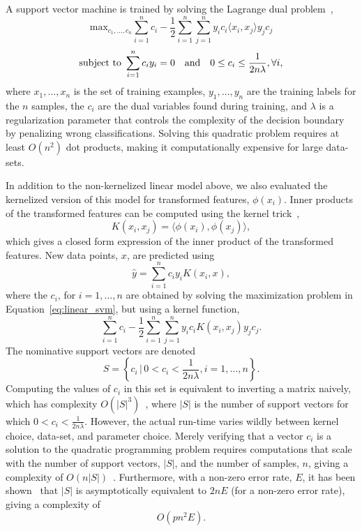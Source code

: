 \documentclass[runningheads]{llncs}
\begin{document}
A support vector machine is trained by solving the Lagrange dual problem~\cite{cortes1995support},
\begin{equation}
    \textrm{max}_{c_1,\ldots,c_n}
    \sum_{i = 1}^n c_i - \frac{1}{2} \sum_{i = 1}^n \sum_{j = 1}^n y_i c_i \langle x_i, x_j \rangle y_j c_j
    \label{eq:linear_svm}
\end{equation}
$$
    \textrm{subject to } \sum_{i = 1}^n c_i y_i = 0 \textrm{\quad and\quad} 0 \leq c_i \leq \frac{1}{2n\lambda}, \forall i,
$$
where $x_1,\ldots,x_n$ is the set of training examples, $y_1,\ldots,y_n$ are the training labels for the $n$ samples, the $c_i$ are the dual variables found during training, and $\lambda$ is a regularization parameter that controls the complexity of the decision boundary by penalizing wrong classifications. Solving this quadratic problem requires at least $O(n^2)$ dot products, making it computationally expensive for large data-sets.

In addition to the non-kernelized linear model above, we also evaluated the kernelized version of this model for transformed features, $\phi(x_i)$. Inner products of the transformed features can be computed using the kernel trick~\cite{cortes1995support},
$$
    K(x_i, x_j) = \langle\phi(x_i), \phi(x_j)\rangle,
$$
which gives a closed form expression of the inner product of the transformed features. New data points, $x$, are predicted using
$$
    \hat{y} = \sum_{i = 1}^n c_i y_i K(x_i, x),
$$
where the $c_i$, for $i=1,\ldots,n$ are obtained by solving the maximization problem in Equation~\ref{eq:linear_svm}, but using a kernel function,
$$
    \sum_{i = 1}^n c_i - \frac{1}{2} \sum_{i=1}^n \sum_{j = 1}^n y_i c_i K(x_i, x_j) y_j c_j.
$$
The nominative support vectors are denoted
$$
    S = \left\{c_i \,\big|\, 0 < c_i < \frac{1}{2n\lambda}, i=1,\ldots,n\right\}.
$$
Computing the values of $c_i$ in this set is equivalent to inverting a matrix naively, which has complexity $O(|S|^3)$~\cite{bordes2005fast}, where $|S|$ is the number of support vectors for which $0 < c_i < \frac{1}{2n\lambda}$. However, the actual run-time varies wildly between kernel choice, data-set, and parameter choice. Merely verifying that a vector $c_i$ is a solution to the quadratic programming problem requires computations that scale with the number of support vectors, $|S|$, and the number of samples, $n$, giving a complexity of $O(n|S|)$~\cite{mehmood2015svm}. Furthermore, with a non-zero error rate, $E$, it has been shown~\cite{christmann2004robustness} that $|S|$ is asymptotically equivalent to $2nE$ (for a non-zero error rate), giving a  complexity of
$$
    O(pn^2E).
$$
\end{document}
